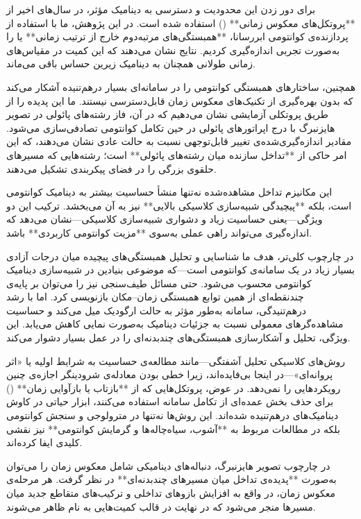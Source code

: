 برای دور زدن این محدودیت و دسترسی به دینامیک مؤثر، در سال‌های اخیر از **پروتکل‌های معکوس زمانی** () استفاده شده است. در این پژوهش، ما با استفاده از پردازنده‌ی کوانتومی ابررسانا، **همبستگی‌های مرتبه‌دوم خارج از ترتیب زمانی** یا  را به‌صورت تجربی اندازه‌گیری کردیم. نتایج نشان می‌دهند که این کمیت در مقیاس‌های زمانی طولانی همچنان به دینامیک زیرین حساس باقی می‌ماند. 

همچنین،  ساختارهای همبستگی کوانتومی را در سامانه‌ای بسیار درهم‌تنیده آشکار می‌کند که بدون بهره‌گیری از تکنیک‌های معکوس زمان قابل‌دسترسی نیستند. ما این پدیده را از طریق پروتکلی آزمایشی نشان می‌دهیم که در آن، فاز رشته‌های پائولی در تصویر هایزنبرگ با درج اپراتورهای پائولی در حین تکامل کوانتومی تصادفی‌سازی می‌شود. مقادیر اندازه‌گیری‌شده‌ی  تغییر قابل‌توجهی نسبت به حالت عادی نشان می‌دهند، که این امر حاکی از **تداخل سازنده میان رشته‌های پائولی** است؛ رشته‌هایی که مسیرهای حلقوی بزرگی را در فضای پیکربندی تشکیل می‌دهند.

این مکانیزم تداخل مشاهده‌شده نه‌تنها منشأ حساسیت بیشتر  به دینامیک کوانتومی است، بلکه **پیچیدگی شبیه‌سازی کلاسیکی بالایی** نیز به آن می‌بخشد. ترکیب این دو ویژگی—یعنی حساسیت زیاد و دشواری شبیه‌سازی کلاسیکی—نشان می‌دهد که اندازه‌گیری  می‌تواند راهی عملی به‌سوی **مزیت کوانتومی کاربردی** باشد.

در چارچوب کلی‌تر، هدف ما شناسایی و تحلیل همبستگی‌های پیچیده میان درجات آزادی بسیار زیاد در یک سامانه‌ی کوانتومی است—که موضوعی بنیادین در شبیه‌سازی دینامیک کوانتومی محسوب می‌شود. حتی مسائل طیف‌سنجی نیز را می‌توان بر پایه‌ی چند‌نقطه‌ای از همین توابع همبستگی زمان–مکان بازنویسی کرد. اما با رشد درهم‌تنیدگی، سامانه به‌طور مؤثر به حالت ارگودیک میل می‌کند و حساسیت مشاهده‌گرهای معمولی نسبت به جزئیات دینامیک به‌صورت نمایی کاهش می‌یابد. این ویژگی، تحلیل و آشکارسازی همبستگی‌های چندبدنه‌ای را در عمل بسیار دشوار می‌کند.

روش‌های کلاسیکی تحلیل آشفتگی—مانند مطالعه‌ی حساسیت به شرایط اولیه یا «اثر پروانه‌ای»—در اینجا بی‌فایده‌اند، زیرا خطی بودن معادله‌ی شرودینگر اجازه‌ی چنین رویکردهایی را نمی‌دهد. در عوض، پروتکل‌هایی که از **بازتاب یا بازآوایی زمان** () برای حذف بخش عمده‌ای از تکامل سامانه استفاده می‌کنند، ابزار حیاتی در کاوش دینامیک‌های درهم‌تنیده شده‌اند. این روش‌ها نه‌تنها در مترو‌لوجی و سنجش کوانتومی بلکه در مطالعات مربوط به **آشوب، سیاه‌چاله‌ها و گرمایش کوانتومی** نیز نقشی کلیدی ایفا کرده‌اند.

در چارچوب تصویر هایزنبرگ، دنباله‌های دینامیکی شامل معکوس زمان را می‌توان به‌صورت **پدیده‌ی تداخل میان مسیرهای چندبدنه‌ای** در نظر گرفت. هر مرحله‌ی معکوس زمان، در واقع به افزایش بازوهای تداخلی و ترکیب‌های متقاطع جدید میان مسیرها منجر می‌شود که در نهایت در قالب کمیت‌هایی به نام  ظاهر می‌شوند. 


